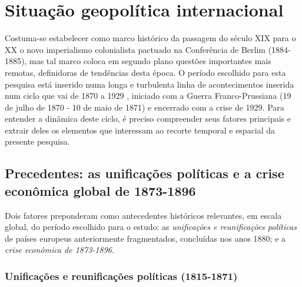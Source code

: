 \section{Situação geopolítica internacional}\label{sec:1.1}

Costuma-se estabelecer como marco histórico da passagem do século XIX para o XX o novo imperialismo colonialista pactuado na Conferência de Berlim (1884-1885), mas tal marco coloca em segundo plano questões importantes mais remotas, definidoras de tendências desta época. O período escolhido para esta pesquisa está inserido numa longa e turbulenta linha de acontecimentos inserida num ciclo que vai de 1870 a 1929 \cite{bernardo_fascismo_2003,bukharin_imperialismo_1986,
hobsbawm_empire_1989,hobsbawm_extremes_1995,hobson_imperialism_1902,
hobson_capitmoderno_1983,KROPOTKIN1901,lenin_imperialismo_1987,luxemburg_acumula_1985,
morris_magnatas_2010}, iniciado com a Guerra Franco-Prussiana (19 de julho de 1870 - 10 de maio de 1871) e encerrado com a crise de 1929. Para entender a dinâmica deste ciclo, é preciso compreender seus fatores principais e extrair deles os elementos que interessam ao recorte temporal e espacial da presente pesquisa. 

\subsection{Precedentes: as unificações políticas e a crise econômica global de 1873-1896}

Dois fatores preponderam como antecedentes históricos relevantes, em escala global, do período escolhido para o estudo: as \textit{unificações e reunificações políticas} de países europeus anteriormente fragmentados, concluídas nos anos 1880; e a \textit{crise econômica de 1873-1896}.

\subsubsection{Unificações e reunificações políticas (1815-1871)}

